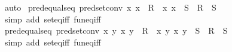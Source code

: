 \begin{isabellebody}
\ auto%
\endisatagproof
{\isafoldproof}%
%
\isadelimproof
%
\endisadelimproof
%
\isadelimdocument
%
\endisadelimdocument
%
\isatagdocument
%
\isamarkuptrue%
%
\endisatagdocument
{\isafolddocument}%
%
\isadelimdocument
%
\endisadelimdocument
{}\isamarkupfalse%
\ pred{\isacharunderscore}{\kern0pt}equals{\isacharunderscore}{\kern0pt}eq\ {\isacharbrackleft}{\kern0pt}pred{\isacharunderscore}{\kern0pt}set{\isacharunderscore}{\kern0pt}conv{\isacharbrackright}{\kern0pt}{\isacharcolon}{\kern0pt}\ {\isachardoublequoteopen}{\isacharparenleft}{\kern0pt}{\isasymlambda}x{\isachardot}{\kern0pt}\ x\ {\isasymin}\ R{\isacharparenright}{\kern0pt}\ {\isacharequal}{\kern0pt}\ {\isacharparenleft}{\kern0pt}{\isasymlambda}x{\isachardot}{\kern0pt}\ x\ {\isasymin}\ S{\isacharparenright}{\kern0pt}\ {\isasymlongleftrightarrow}\ R\ {\isacharequal}{\kern0pt}\ S{\isachardoublequoteclose}\isanewline
%
\isadelimproof
\ \ %
\endisadelimproof
%
\isatagproof
{}\isamarkupfalse%
\ {\isacharparenleft}{\kern0pt}simp\ add{\isacharcolon}{\kern0pt}\ set{\isacharunderscore}{\kern0pt}eq{\isacharunderscore}{\kern0pt}iff\ fun{\isacharunderscore}{\kern0pt}eq{\isacharunderscore}{\kern0pt}iff{\isacharparenright}{\kern0pt}%
\endisatagproof
{\isafoldproof}%
%
\isadelimproof
\isanewline
%
\endisadelimproof
\isanewline
{}\isamarkupfalse%
\ pred{\isacharunderscore}{\kern0pt}equals{\isacharunderscore}{\kern0pt}eq{}\ {\isacharbrackleft}{\kern0pt}pred{\isacharunderscore}{\kern0pt}set{\isacharunderscore}{\kern0pt}conv{\isacharbrackright}{\kern0pt}{\isacharcolon}{\kern0pt}\ {\isachardoublequoteopen}{\isacharparenleft}{\kern0pt}{\isasymlambda}x\ y{\isachardot}{\kern0pt}\ {\isacharparenleft}{\kern0pt}x{\isacharcomma}{\kern0pt}\ y{\isacharparenright}{\kern0pt}\ {\isasymin}\ R{\isacharparenright}{\kern0pt}\ {\isacharequal}{\kern0pt}\ {\isacharparenleft}{\kern0pt}{\isasymlambda}x\ y{\isachardot}{\kern0pt}\ {\isacharparenleft}{\kern0pt}x{\isacharcomma}{\kern0pt}\ y{\isacharparenright}{\kern0pt}\ {\isasymin}\ S{\isacharparenright}{\kern0pt}\ {\isasymlongleftrightarrow}\ R\ {\isacharequal}{\kern0pt}\ S{\isachardoublequoteclose}\isanewline
%
\isadelimproof
\ \ %
\endisadelimproof
%
\isatagproof
{}\isamarkupfalse%
\ {\isacharparenleft}{\kern0pt}simp\ add{\isacharcolon}{\kern0pt}\ set{\isacharunderscore}{\kern0pt}eq{\isacharunderscore}{\kern0pt}iff\ fun{\isacharunderscore}{\kern0pt}eq{\isacharunderscore}{\kern0pt}iff{\isacharparenright}{\kern0pt}%
\endisatagproof
{\isafoldproof}%
%

\end{isabellebody}
